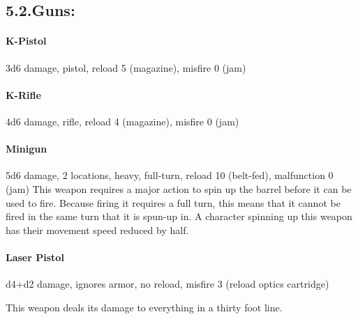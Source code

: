 \documentclass{article}
\begin{document}
\subsection{5.2.\hspace*{0.5em}Guns:}\label{sec-guns-}%

\paragraph{K-Pistol}\label{sec-k-pistol}%

\noindent{}3d6 damage, pistol, reload 5 (magazine), misfire 0 (jam) %

\paragraph{K-Rifle}\label{sec-k-rifle}%

\noindent{}4d6 damage, rifle, reload 4 (magazine), misfire 0 (jam) %

\paragraph{Minigun}\label{sec-minigun}%

\noindent{}5d6 damage, 2 locations, heavy, full-turn, reload 10 (belt-fed), malfunction 0 (jam)\mdbr
{}This weapon requires a major action to spin up the barrel before it can be used to fire. Because firing it requires a full turn, this means that it cannot be fired in the same turn that it is spun-up in.\mdbr
{}A character spinning up this weapon has their movement speed reduced by half.%

\paragraph{Laser Pistol}\label{sec-laser-pistol}%

\noindent{}d4+d2 damage, ignores armor, no reload, misfire 3 (reload optics cartridge)%

This weapon deals its damage to everything in a thirty foot line.%
\end{document}
